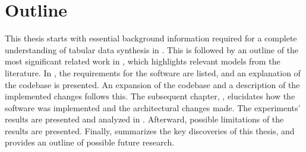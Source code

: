 \newpage
\section{Outline}
\label{ch:intro-outline}

This thesis starts with essential background information required for a complete understanding of tabular data synthesis in .
This is followed by an outline of the most significant related work in , which highlights relevant \glspl{model} from the literature.
In , the requirements for the software are listed, and an explanation of the codebase is presented. 
An expansion of the codebase and a description of the implemented changes follows this. 
The subsequent chapter, , elucidates how the software was implemented and the architectural changes made.
The experiments' results are presented and analyzed in . 
Afterward, possible limitations of the results are presented. 
Finally,  summarizes the key discoveries of this thesis, and provides an outline of possible future research.